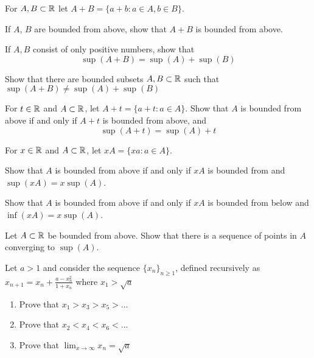\documentclass[../notes.tex]{subfiles}
\begin{document}
\begin{homework}
    For $A,B\subset \mathbb R$ let $A+B=\{a+b: a\in A, b\in B\}$. 
    \begin{listalph}
        \item If $A$, $B$ are bounded from above, show that $A+B$ is bounded from above. 
        \item If $A,B$ consist of only positive numbers, show that \[ \sup(A+B)=\sup(A)+\sup(B)\]
        \item Show that there are bounded subsets $A,B\subset \mathbb R$ such that $\sup(A+B)\neq \sup(A)+\sup(B)$ 
    \end{listalph}    
\end{homework}

\begin{homework} 
    For $t\in \mathbb R$ and $A\subset \mathbb R$, let $A+t=\{a+t : a\in A\}$. Show that $A$ is bounded from above if and only if $A+t$ is bounded from above, and 
    \[ \sup(A+t) = \sup(A)+t\]
\end{homework}

\begin{homework}
For $x\in \mathbb R$ and $A\subset \mathbb R$, let $xA  = \{xa : a\in A\}$.
\begin{listalph}
     \item  Show that $A$ is bounded from above if and only if $xA$ is bounded from and $\sup(xA)=x\sup(A)$. \item Show that $A$ is bounded from above if and only if $xA$ is bounded from below and $\inf(xA)=x\sup(A)$.
\end{listalph}
\end{homework}

\begin{homework}
    Let $A\subset \mathbb R$ be bounded from above. Show that there is a sequence of points in $A$ converging to $\sup(A)$. 
\end{homework}

\begin{homework}
     Let $a > 1$ and consider the sequence $\{x_n\}_{n\geq 1}$, defined recursively as $x_{n+1} = x_n + \frac{a-x_n^2}{1+x_n}$ where $x_1 > \sqrt{a}$
    \begin{enumerate}[label=\alph*.]
        \item Prove that $x_1 > x_3 > x_5 > ...$
        \item Prove that $x_2 < x_4 < x_6 < ...$
        \item Prove that $\lim_{x \to \infty} x_n = \sqrt{a}$
    \end{enumerate}
\end{homework}
\end{document}
